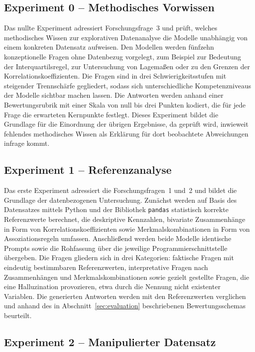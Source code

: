 \subsection*{Experiment 0 -- Methodisches Vorwissen}

Das nullte Experiment adressiert Forschungsfrage~3 und prüft, welches methodisches Wissen zur explorativen Datenanalyse die Modelle unabhängig von einem konkreten Datensatz aufweisen. Den Modellen werden fünfzehn konzeptionelle Fragen ohne Datenbezug vorgelegt, zum Beispiel zur Bedeutung der Interquartilsregel, zur Untersuchung von Lagemaßen oder zu den Grenzen der Korrelationskoeffizienten. Die Fragen sind in drei Schwierigkeitsstufen mit steigender Trennschärfe gegliedert, sodass sich unterschiedliche Kompetenzniveaus der Modelle sichtbar machen lassen. Die Antworten werden anhand einer Bewertungsrubrik mit einer Skala von null bis drei Punkten kodiert, die für jede Frage die erwarteten Kernpunkte festlegt. Dieses Experiment bildet die Grundlage für die Einordnung der übrigen Ergebnisse, da geprüft wird, inwieweit fehlendes methodisches Wissen als Erklärung für dort beobachtete Abweichungen infrage kommt.

\subsection*{Experiment 1 -- Referenzanalyse}

Das erste Experiment adressiert die Forschungsfragen~1 und~2 und bildet die Grundlage der datenbezogenen Untersuchung. Zunächst werden auf Basis des Datensatzes  mittels Python und der Bibliothek \texttt{pandas} statistisch korrekte Referenzwerte berechnet, die deskriptive Kennzahlen, bivariate Zusammenhänge in Form von Korrelationskoeffizienten sowie Merkmalskombinationen in Form von Assoziationsregeln umfassen. Anschließend werden beide Modelle identische Prompts sowie die Rohfassung über die jeweilige Programmierschnittstelle übergeben. Die Fragen gliedern sich in drei Kategorien: faktische Fragen mit eindeutig bestimmbaren Referenzwerten, interpretative Fragen nach Zusammenhängen und Merkmalskombinationen sowie gezielt gestellte Fragen, die eine Halluzination provozieren, etwa durch die Nennung nicht existenter Variablen. Die generierten Antworten werden mit den Referenzwerten verglichen und anhand des in Abschnitt~\ref{sec:evaluation} beschriebenen Bewertungsschemas beurteilt.

\subsection*{Experiment 2 -- Manipulierter Datensatz}

